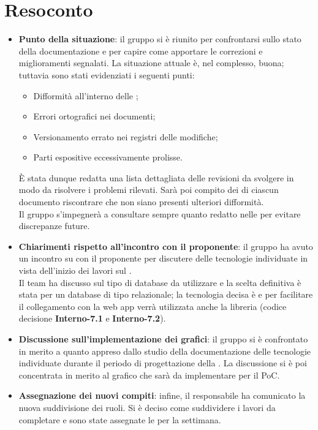 \section{Resoconto}
\begin{itemize}
\item \textbf{Punto della situazione}: il gruppo si è riunito per confrontarsi sullo stato della documentazione e per capire come apportare le correzioni  e miglioramenti segnalati. La situazione attuale è, nel complesso, buona; tuttavia sono stati evidenziati i seguenti punti:
	\begin{itemize}
		\item Difformità all'interno delle ;
		\item Errori ortografici nei documenti;
		\item Versionamento errato nei registri delle modifiche;
		\item Parti espositive eccessivamente prolisse.
	\end{itemize} 
È stata dunque redatta una lista dettagliata delle revisioni da svolgere in modo da risolvere i problemi rilevati. Sarà poi compito dei  di ciascun documento riscontrare che non siano presenti ulteriori difformità. \\
Il gruppo s'impegnerà a consultare sempre quanto redatto nelle \NdP per evitare discrepanze future.

\item\textbf{Chiarimenti rispetto all'incontro con il proponente}: il gruppo ha avuto un incontro su  con il proponente per discutere delle tecnologie individuate in vista dell'inizio dei lavori sul \textit{}. \\ Il team ha discusso sul tipo di database da utilizzare e la scelta definitiva è stata per un database di tipo relazionale; la tecnologia decisa è \textit{} e per facilitare il collegamento con la web app verrà utilizzata anche la libreria \textit{} (codice decisione \textbf{Interno-7.1} e \textbf{Interno-7.2}).

\item\textbf{Discussione sull'implementazione dei grafici}: il gruppo si è confrontato in merito a quanto appreso dallo studio della documentazione delle tecnologie individuate durante il periodo di progettazione della . La discussione si è poi concentrata in merito al grafico che sarà da implementare per il PoC.

\item \textbf{Assegnazione dei nuovi compiti}: infine, il responsabile ha comunicato la nuova suddivisione dei ruoli. Si è deciso come suddividere i lavori da completare e sono state assegnate le  per la settimana.
\end{itemize}

\newpage